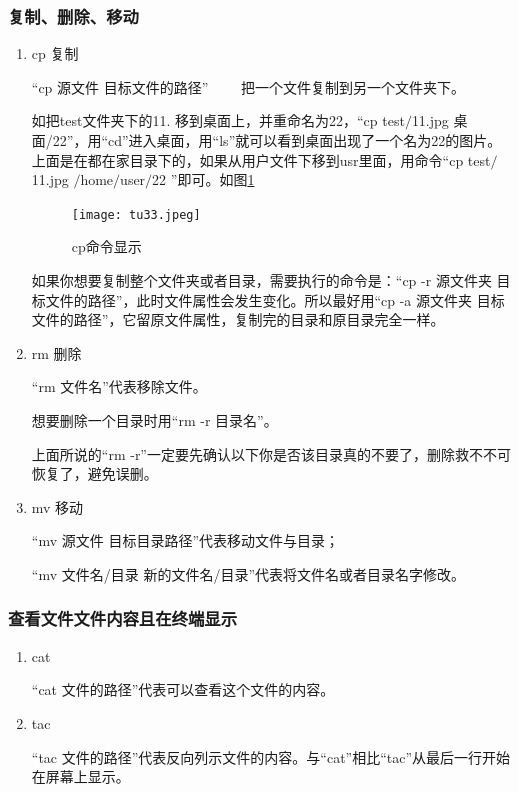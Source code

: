 \documentclass{article}
\begin{document}
\subsubsection{复制、删除、移动}
\begin{enumerate}
\item cp 复制

“cp 源文件 目标文件的路径”  ~~~~把一个文件复制到另一个文件夹下。

如把test文件夹下的11. 移到桌面上，并重命名为22，“cp test$\slash$11.jpg 桌面/22”，用“cd”进入桌面，用“ls”就可以看到桌面出现了一个名为22的图片。上面是在都在家目录下的，如果从用户文件下移到usr里面，用命令“cp test$\slash$11.jpg $\slash$home$\slash$user$\slash$22 ”即可。如图\ref{tu33}
\begin{figure}[!htb] %
\centering
\texttt{[image: tu33.jpeg]}
\caption{\small cp命令显示}
\label{tu33}
\end{figure} 

 如果你想要复制整个文件夹或者目录，需要执行的命令是：“cp -r 源文件夹 目标文件的路径”，此时文件属性会发生变化。所以最好用“cp -a 源文件夹 目标文件的路径”，它留原文件属性，复制完的目录和原目录完全一样。

\item rm 删除

“rm 文件名”代表移除文件。

想要删除一个目录时用“rm -r 目录名”。

{\color{blue}上面所说的“rm -r”一定要先确认以下你是否该目录真的不要了，删除救不不可恢复了，避免误删}。

\item mv 移动

“mv 源文件 目标目录路径”代表移动文件与目录；

“mv 文件名/目录 新的文件名/目录”代表将文件名或者目录名字修改。
\end{enumerate}
\subsubsection{查看文件文件内容且在终端显示}
\begin{enumerate}
\item cat

“cat 文件的路径”代表可以查看这个文件的内容。

\item tac

“tac 文件的路径”代表反向列示文件的内容。与“cat”相比“tac”从最后一行开始在屏幕上显示。
\end{enumerate}
\end{document}
